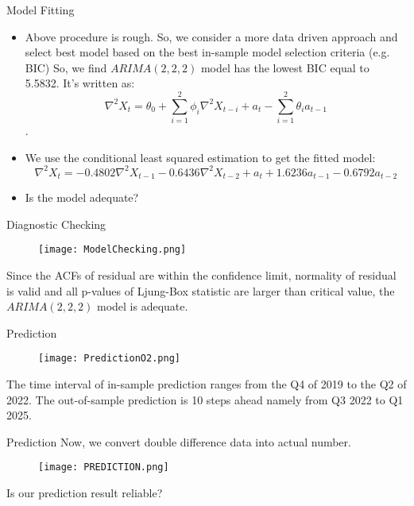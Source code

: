 \documentclass{beamer}
\begin{document}
\begin{frame}{Model Fitting}
\begin{itemize}
    \item Above procedure is rough. So, we consider a more data driven approach and select best model based on the best in-sample model selection criteria (e.g. BIC) So, we find $ARIMA(2,2,2)$ model has the lowest BIC equal to 5.5832. It's written as: \[\nabla ^2X_{t} =\theta_{0}+\sum_{i=1}^{2}\phi_{i}\nabla^2X_{t-i}+a_{t}-\sum_{i=1}^{2}\theta_{i}a_{t-1}\].
    \item We use the conditional least squared estimation to get the fitted model: 
    \[\nabla^2X_{t} =-0.4802\nabla^2X_{t-1}-0.6436\nabla^2X_{t-2}+a_{t}+1.6236a_{t-1}-0.6792a_{t-2}\]
    \item Is the model adequate?
\end{itemize}
    
\end{frame}
\begin{frame}{Diagnostic Checking}
\begin{figure}
    \centering
    \texttt{[image: ModelChecking.png]}
    \label{fig:my_label}
\end{figure}
Since the ACFs of residual are within the confidence limit, normality of residual is valid and all p-values of Ljung-Box statistic are larger than critical value, the $ARIMA(2,2,2)$ model is adequate.
    
\end{frame}
\begin{frame}{Prediction}
\begin{figure}
    \centering
    \texttt{[image: PredictionO2.png]}
    \label{fig:my_label}
\end{figure}
The time interval of in-sample prediction ranges from the Q4 of 2019 to the Q2 of 2022. The out-of-sample prediction is 10 steps ahead namely from Q3 2022 to Q1 2025.
    
\end{frame}

\begin{frame}{Prediction}
Now, we convert double difference data into actual number.
\begin{figure}
    \centering
    \texttt{[image: PREDICTION.png]}
    \label{fig:my_label}
\end{figure}
Is our prediction result reliable?
\end{frame}
\end{document}
